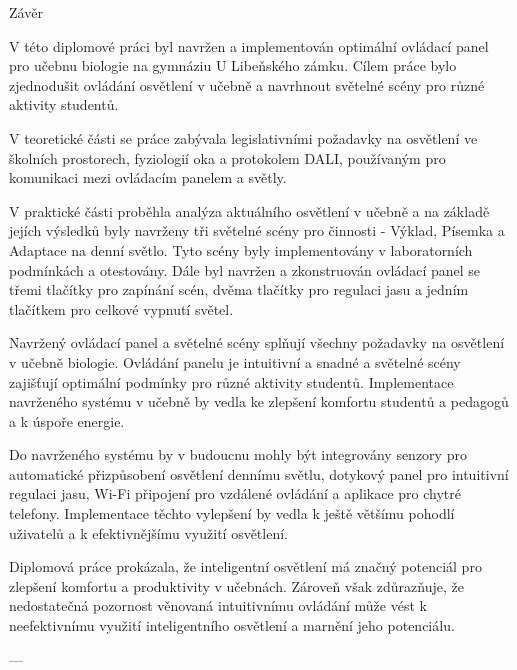 \nonum\chap Závěr

V této diplomové práci byl navržen a implementován optimální ovládací panel pro učebnu
biologie na gymnáziu U Libeňského zámku.
Cílem práce bylo zjednodušit ovládání osvětlení v učebně a navrhnout světelné scény pro různé aktivity studentů.


V teoretické části se práce zabývala legislativními požadavky na osvětlení ve školních prostorech,
fyziologií oka a protokolem DALI, používaným pro komunikaci mezi ovládacím panelem a světly.

V praktické části proběhla analýza aktuálního osvětlení v učebně a na základě jejích
výsledků byly navrženy tři světelné scény pro činnosti - Výklad, Písemka a Adaptace na denní světlo.
Tyto scény byly implementovány v laboratorních podmínkách a otestovány.
Dále byl navržen a zkonstruován ovládací panel se třemi tlačítky pro zapínání scén, dvěma tlačítky pro regulaci jasu
a jedním tlačítkem pro celkové vypnutí světel.

Navržený ovládací panel a světelné scény splňují všechny požadavky na osvětlení v učebně biologie.
Ovládání panelu je intuitivní a snadné a světelné scény zajišťují optimální podmínky pro různé aktivity studentů.
Implementace navrženého systému v učebně by vedla ke zlepšení komfortu studentů a pedagogů a k úspoře energie.

Do navrženého systému by v budoucnu mohly být integrovány senzory pro automatické přizpůsobení
osvětlení dennímu světlu, dotykový panel pro intuitivní regulaci jasu,
Wi-Fi připojení pro vzdálené ovládání a aplikace pro chytré telefony.
Implementace těchto vylepšení by vedla k ještě většímu pohodlí uživatelů a k efektivnějšímu využití osvětlení.


Diplomová práce prokázala, že inteligentní osvětlení má značný potenciál
pro zlepšení komfortu a produktivity v učebnách.
Zároveň však zdůrazňuje, že nedostatečná pozornost věnovaná
intuitivnímu ovládání může vést k neefektivnímu využití inteligentního osvětlení a marnění jeho potenciálu.



---




